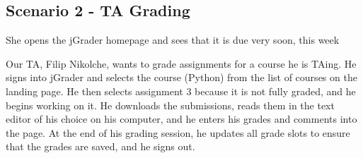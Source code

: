 \subsection{Scenario 2 - TA Grading}

She opens the jGrader homepage and sees that it is due very soon, this week

Our TA, Filip Nikolche, wants to grade assignments for a course he is TAing. 
He signs into jGrader and selects the course (Python) from the list of courses on the landing page. He then selects assignment 3 because it is not fully graded, and he begins working on it. He downloads the submissions, reads them in the text editor of his choice on his computer, and he enters his grades and comments into the page. At the end of his grading session, he updates all grade slots to ensure that the grades are saved, and he signs out. 

